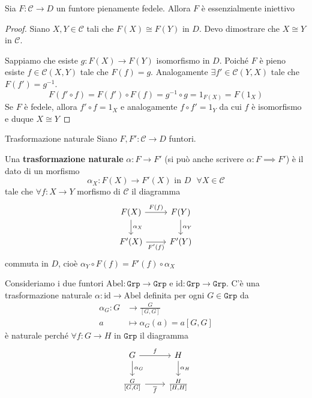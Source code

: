 \begin{proposition}{}
    Sia \(F: \mathcal{C} \to D\) un funtore pienamente fedele. Allora \(F\) è
    essenzialmente iniettivo
\end{proposition}
\begin{proof}{}
    Siano \(X, Y \in \mathcal{C}\) tali che \(F{(X)} \cong F{(Y)}\) in \(D\). Devo
    dimostrare che \(X \cong Y\) in \(\mathcal{C}\).

    Sappiamo che esiste \(g : F{(X)} \to F{(Y)}\) isomorfismo in \(D\). Poiché
    \(F\) è pieno esiste \(f \in \mathcal{C}{(X, Y)}\) tale che \(F{(f)} = g\).
    Analogamente \(\exists f' \in \mathcal{C}{(Y, X)}\) tale che \(F{(f')} = g^{-1}\).
    \[
    F{(f' \circ f)} = F{(f')} \circ F{(f)} = g^{-1} \circ g = 1_{F{(X)}} = F{(1_X)}
    \]
    Se \(F\) è fedele, allora \(f' \circ f = 1_X\)  e analogamente \(f \circ f' = 1_Y\) da cui \(f\) è isomorfismo e duque \(X \cong Y\) 
\end{proof}

\begin{definition}{Trasformazione naturale}
    Siano \(F, F' : \mathcal{C} \to D\) funtori.

    Una \textbf{trasformazione naturale} \(\alpha : F \to F'\) (si può anche
    scrivere \(\alpha : F \implies F'\)) è il dato di un morfismo
    \[
      \alpha_X : F{(X)} \to F'{(X)} \text{ in \(D\) } \forall X \in \mathcal{C}
    \]
    tale che \(\forall f : X \to Y\) morfismo di \(\mathcal{C}\) il diagramma
\[\begin{tikzcd}
	{F(X)} & {F(Y)} \\
	{F'(X)} & {F'(Y)}
	\arrow["{F(f)}", from=1-1, to=1-2]
	\arrow["{\alpha_X}", from=1-1, to=2-1]
	\arrow["{\alpha_Y}", from=1-2, to=2-2]
	\arrow["{F'(f)}"', from=2-1, to=2-2]
\end{tikzcd}\]
    commuta in \(D\), cioè \(\alpha_Y \circ F{(f)} = F'{(f)} \circ \alpha_X\) 
\end{definition}

\begin{example}{}
    Consideriamo i due funtori \(\mathrm{Abel} : \mathtt{Grp} \to \mathtt{Grp}\) e \(\mathrm{id} : \mathtt{Grp} \to \mathtt{Grp}\). 
    C'è una trasformazione naturale \(\alpha : \mathrm{id} \to \mathrm{Abel}\)
    definita per ogni \(G \in \mathtt{Grp}\) da 
    \begin{align*}
        \alpha_G: G &\longrightarrow \frac{G}{[G, G]} \\
        a &\longmapsto \alpha_G(a) = a[G, G]
    \end{align*}
    è naturale perché \(\forall f : G \to H\) in \(\mathtt{Grp}\) il diagramma
\[\begin{tikzcd}
	{G} & {H} \\
    {\frac{G}{[G,G]}} & {\frac{H}{[H,H]}}
	\arrow["f", from=1-1, to=1-2]
	\arrow["{\alpha_G}", from=1-1, to=2-1]
	\arrow["{\alpha_H}", from=1-2, to=2-2]
	\arrow["\overline{f}"', from=2-1, to=2-2]
\end{tikzcd}\]
\end{example}

